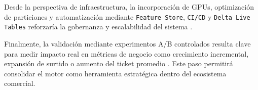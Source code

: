 Desde la perspectiva de infraestructura, la incorporación de GPUs, optimización de particiones y automatización mediante \texttt{Feature Store}, \texttt{CI/CD} y \texttt{Delta Live Tables} reforzaría la gobernanza y escalabilidad del sistema \cite{ARTICLE:Sculley2015, ARTICLE:Zaharia2010}.

Finalmente, la validación mediante experimentos A/B controlados resulta clave para medir impacto real en métricas de negocio como crecimiento incremental, expansión de surtido o aumento del ticket promedio \cite{ARTICLE:Bakshy2014, ARTICLE:Kohavi2009, ARTICLE:Deng2013}. Este paso permitirá consolidar el motor como herramienta estratégica dentro del ecosistema comercial.